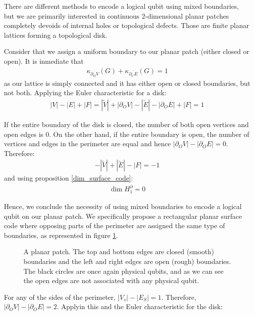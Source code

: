 \documentclass[12pt, twoside, openany]{book}
\begin{document}
There are different methods to encode a logical qubit using mixed boundaries, but we are primarily interested in continuous 2-dimensional planar patches completely devoids of internal holes or topological defects. Those are finite planar lattices forming a topological disk. 

Consider that we assign a uniform boundary to our planar patch (either closed or open). It is inmediate that
\begin{align*}
    \kappa_{\overline{\partial_O V}}(G) + \kappa_{\overline{\partial_C E}}(G) = 1
\end{align*}
as our lattice is simply connected and it has either open or closed boundaries, but not both. Applying the Euler characteristic for a disk:
\begin{align*}
    |V|-|E|+|F| = |\tilde{V}| + |\partial_O V| - |\tilde{E}| - |\partial_O E|+|F| = 1
\end{align*}

If the entire boundary of the disk is closed, the number of both open vertices and open edges is 0. On the other hand, if the entire boundary is open, the number of vertices and edges in the perimeter are equal and hence $|\partial_O V| - |\partial_O E| = 0$. Therefore:
\begin{align*}
    -|\tilde{V}| + |\tilde{E}| - |F| = -1
\end{align*}
and using proposition \ref{dim_surface_code}:
\begin{align*}
    \dim H_1^\partial = 0
\end{align*}

Hence, we conclude the necessity of using mixed boundaries to encode a logical qubit on our planar patch. We specifically propose a rectangular planar surface code where opposing parts of the perimeter are assigned the same type of boundaries, as represented in figure \ref{fig:planarpatch}.

\begin{figure}
    \centering
    
    \caption{A planar patch. The top and bottom edges are closed (smooth) boundaries and the left and right edges are open (rough) boundaries. The black circles are once again physical qubits, and as we can see the open edges are not associated with any physical qubit.}
    \label{fig:planarpatch}
\end{figure}

For any of the sides of the perimeter, $|V_s| - |E_S| = 1$. Therefore, $|\partial_O V| - |\partial_O E| = 2$. Applyin this and the Euler characteristic for the disk:
\end{document}
